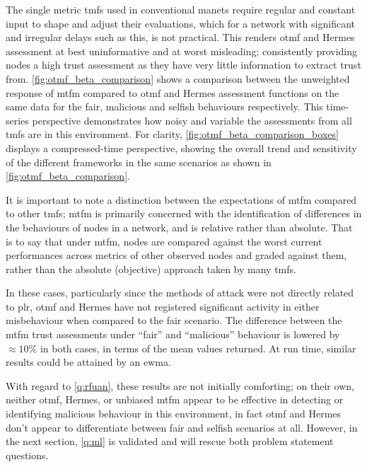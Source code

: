 The single metric \glspl{tmf} used in conventional \gls{manet}s require regular and constant input to shape and adjust their evaluations, which for a network with significant and irregular delays such as this, is not practical.
This renders \gls{otmf} and Hermes assessment at best uninformative and at worst misleading; consistently providing nodes a high trust assessment as they have very little information to extract trust from. 
\autoref{fig:otmf_beta_comparison} shows a comparison between the unweighted response of \gls{mtfm} compared to \gls{otmf} and Hermes assessment functions on the same data for the fair, malicious and selfish behaviours respectively.
This time-series perspective demonstrates how noisy and variable the assessments from all \glspl{tmf} are in this environment.
For clarity, \autoref{fig:otmf_beta_comparison_boxes} displays a compressed-time perspective, showing the overall trend and sensitivity of the different frameworks in the same scenarios as shown in \autoref{fig:otmf_beta_comparison}.

It is important to note a distinction between the expectations of \gls{mtfm} compared to other \glspl{tmf}; \gls{mtfm} is primarily concerned with the identification of differences in the behaviours of nodes in a network, and is relative rather than absolute.
That is to say that under \gls{mtfm}, nodes are compared against the worst current performances across metrics of other observed nodes and graded against them, rather than the absolute (objective) approach taken by many \glspl{tmf}.

In these cases, particularly since the methods of attack were not directly related to \gls{plr}, \gls{otmf} and Hermes have not registered significant activity in either misbehaviour when compared to the fair scenario.
The difference between the \gls{mtfm} trust assessments under ``fair'' and ``malicious'' behaviour is lowered by $\approx 10\%$ in both cases, in terms of the mean values returned.
At run time, similar results could be attained by an \gls{ewma}.

With regard to \autoref{q:rfuan}, these results are not initially comforting; on their own, neither \gls{otmf}, Hermes, or unbiased \gls{mtfm} appear to be effective in detecting or identifying malicious behaviour in this environment, in fact \gls{otmf} and Hermes don't appear to differentiate between fair and selfish scenarios at all. 
However, in the next section, \autoref{q:ml} is validated and will rescue both problem statement questions.



